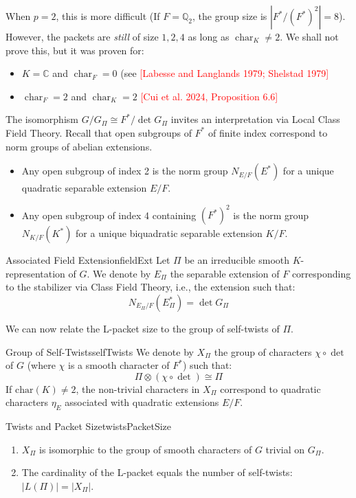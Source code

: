 \documentclass{article}
\begin{document}
When $p =2$, this is more difficult (If $F = \mathbb{Q}_2$, the group size is $|F^*/(F^*)^2| = 8$). However, the
packets are \emph{still} of size $1,2,4$ as long as $\operatorname{char}_K \ne 2$. We shall not prove this, but it was proven
for:
\begin{itemize}
  \item $K = \mathbb{C}$ and $\operatorname{char}_F = 0$ (see \textcolor{red}{[Labesse and Langlands 1979; Shelstad 1979]}
  \item $\operatorname{char}_F = 2$ and $\operatorname{char}_K = 2$ \textcolor{red}{[Cui et al. 2024, Proposition 6.6]}
\end{itemize}

The isomorphism \(G/G_\Pi \cong F^*/\det G_\Pi\) invites an interpretation via Local Class Field Theory. Recall that open subgroups of \(F^*\) of finite index correspond to norm groups of abelian extensions.
\begin{itemize}
    \item Any open subgroup of index 2 is the norm group \(N_{E/F}(E^*)\) for a unique quadratic separable extension \(E/F\).
    \item Any open subgroup of index 4 containing \((F^*)^2\) is the norm group \(N_{K/F}(K^*)\) for a unique biquadratic separable extension \(K/F\).
\end{itemize}

\begin{defn}{Associated Field Extension}{fieldExt}
  Let \(\Pi\) be an irreducible smooth \(K\)-representation of \(G\). We denote by \(E_\Pi\) the separable extension of \(F\) corresponding to the stabilizer via Class Field Theory, i.e., the extension such that:
  \[ N_{E_\Pi/F}(E_\Pi^*) = \det G_\Pi \]
\end{defn}

We can now relate the L-packet size to the group of self-twists of \(\Pi\).

\begin{defn}{Group of Self-Twists}{selfTwists}
  We denote by \(X_\Pi\) the group of characters \(\chi \circ \det\) of \(G\) (where \(\chi\) is a smooth character of \(F^*\)) such that:
  \[ \Pi \otimes (\chi \circ \det) \cong \Pi \]
  If \(\mathrm{char}(K) \neq 2\), the non-trivial characters in \(X_\Pi\) correspond to quadratic characters \(\eta_E\) associated with quadratic extensions \(E/F\).
\end{defn}

\begin{prop}{Twists and Packet Size}{twistsPacketSize}
  \begin{enumerate}
      \item \(X_\Pi\) is isomorphic to the group of smooth characters of \(G\) trivial on \(G_\Pi\).
      \item The cardinality of the L-packet equals the number of self-twists: \(|L(\Pi)| = |X_\Pi|\).
  \end{enumerate}
\end{prop}
\end{document}
